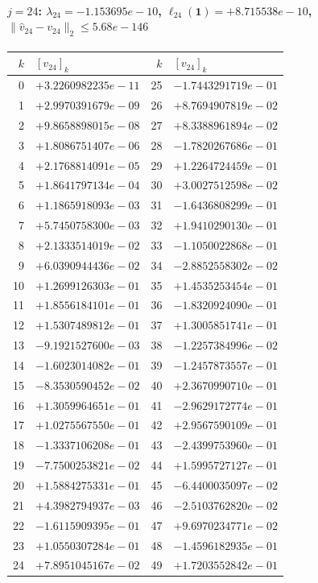 \documentclass[11pt]{article}
\begin{document}
\paragraph{$j = 24$: $\lambda_{24} = -1.153695e-10$, \quad $\ell_{24}(\mathbf{1}) = +8.715538e-10$, \quad $\|\hat{v}_{24} - v_{24}\|_2 \leq 5.68e-146$}
\begin{center}
{\footnotesize
\begin{tabular}{r@{\;\;}l@{\quad}r@{\;\;}l}
\toprule
$k$ & $[v_{24}]_k$ & $k$ & $[v_{24}]_k$ \\
\midrule
0 & $+3.2260982235e-11$ & 25 & $-1.7443291719e-01$ \\
1 & $+2.9970391679e-09$ & 26 & $+8.7694907819e-02$ \\
2 & $+9.8658898015e-08$ & 27 & $+8.3388961894e-02$ \\
3 & $+1.8086751407e-06$ & 28 & $-1.7820267686e-01$ \\
4 & $+2.1768814091e-05$ & 29 & $+1.2264724459e-01$ \\
5 & $+1.8641797134e-04$ & 30 & $+3.0027512598e-02$ \\
6 & $+1.1865918093e-03$ & 31 & $-1.6436808299e-01$ \\
7 & $+5.7450758300e-03$ & 32 & $+1.9410290130e-01$ \\
8 & $+2.1333514019e-02$ & 33 & $-1.1050022868e-01$ \\
9 & $+6.0390944436e-02$ & 34 & $-2.8852558302e-02$ \\
10 & $+1.2699126303e-01$ & 35 & $+1.4535253454e-01$ \\
11 & $+1.8556184101e-01$ & 36 & $-1.8320924090e-01$ \\
12 & $+1.5307489812e-01$ & 37 & $+1.3005851741e-01$ \\
13 & $-9.1921527600e-03$ & 38 & $-1.2257384996e-02$ \\
14 & $-1.6023014082e-01$ & 39 & $-1.2457873557e-01$ \\
15 & $-8.3530590452e-02$ & 40 & $+2.3670990710e-01$ \\
16 & $+1.3059964651e-01$ & 41 & $-2.9629172774e-01$ \\
17 & $+1.0275567550e-01$ & 42 & $+2.9567590109e-01$ \\
18 & $-1.3337106208e-01$ & 43 & $-2.4399753960e-01$ \\
19 & $-7.7500253821e-02$ & 44 & $+1.5995727127e-01$ \\
20 & $+1.5884275331e-01$ & 45 & $-6.4400035097e-02$ \\
21 & $+4.3982794937e-03$ & 46 & $-2.5103762820e-02$ \\
22 & $-1.6115909395e-01$ & 47 & $+9.6970234771e-02$ \\
23 & $+1.0550307284e-01$ & 48 & $-1.4596182935e-01$ \\
24 & $+7.8951045167e-02$ & 49 & $+1.7203552842e-01$ \\
\bottomrule
\end{tabular}
}
\end{center}
\end{document}
